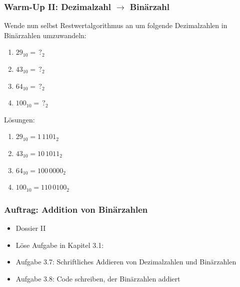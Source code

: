 \documentclass{beamer}
\begin{document}
\begin{frame}
    \frametitle{Warm-Up II: Dezimalzahl $\rightarrow$ Binärzahl}
    
    Wende nun selbst Restwertalgorithmus an um folgende Dezimalzahlen in Binärzahlen umzuwandeln:
    \begin{enumerate}
        \item $29_{10}  = \,?_2$ %
        \item $43_{10}  = \,?_2$ %
        \item $64_{10}  = \,?_2$ %
        \item $100_{10} = \,?_2$ %
    \end{enumerate}
    Lösungen:
    \begin{enumerate}
        \item $29_{10}  =   1\,1101_2$
        \item $43_{10}  =  10\,1011_2$
        \item $64_{10}  = 100\,0000_2$
        \item $100_{10} = 110\,0100_2$
    \end{enumerate}
\end{frame}


\begin{frame}
    \frametitle{Auftrag: Addition von Binärzahlen}

    \begin{itemize}
        \item Dossier II
        \item {}Löse Aufgabe in Kapitel 3.1:
        \item {}Aufgabe 3.7: Schriftliches Addieren von Dezimalzahlen und Binärzahlen
        \item {}Aufgabe 3.8: Code schreiben, der Binärzahlen addiert
    \end{itemize}
\end{frame}


\end{document}
